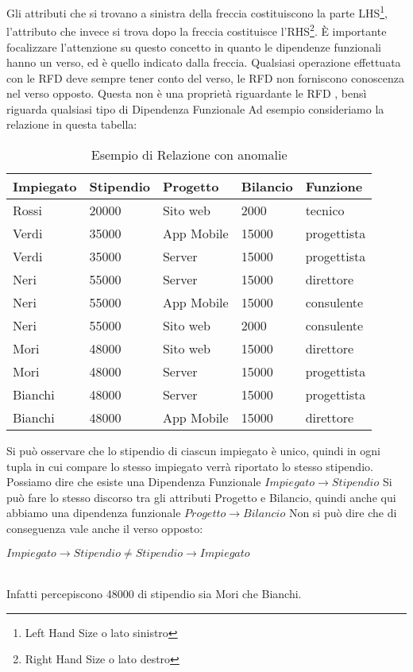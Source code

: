 Gli attributi che si trovano a sinistra della freccia costituiscono la parte LHS\footnote{Left Hand Size o lato sinistro}, l'attributo che invece si trova dopo la freccia costituisce l'RHS\footnote{Right Hand Size o lato destro}. 
È importante focalizzare l'attenzione su questo concetto in quanto le dipendenze funzionali hanno un verso, ed è quello indicato dalla freccia. Qualsiasi operazione effettuata con le RFD deve sempre tener conto del verso, le RFD non forniscono conoscenza nel verso opposto. Questa non è una proprietà riguardante le RFD , bensì riguarda qualsiasi tipo di Dipendenza Funzionale
Ad esempio consideriamo la relazione in questa tabella:
\\
\begin{table}[H]
    \centering
    \begin{tabular}{l |l |l |l |l }
     Impiegato & Stipendio & Progetto & Bilancio & Funzione \\
    \hline
    Rossi & 20000  & Sito web & 2000 & tecnico\\
    Verdi & 35000 & App Mobile & 15000 & progettista\\
    Verdi & 35000 & Server & 15000 & progettista\\
    Neri & 55000 & Server & 15000 & direttore\\
    Neri & 55000 & App Mobile & 15000 & consulente\\
    Neri & 55000 & Sito web & 2000 & consulente\\
    Mori & 48000 & Sito web & 15000 & direttore\\
    Mori & 48000 & Server & 15000 & progettista\\
    Bianchi & 48000 & Server & 15000 & progettista\\
    Bianchi & 48000 & App Mobile & 15000 & direttore\\
    \end{tabular}
    \caption{Esempio di Relazione con anomalie}
    \label{tab:relationship_anomalies}
\end{table}
Si può osservare che lo stipendio di ciascun impiegato è unico, quindi in ogni tupla in cui compare lo stesso impiegato verrà riportato lo stesso stipendio. Possiamo dire che esiste una Dipendenza Funzionale 
$Impiegato \xrightarrow{} Stipendio$
Si può fare lo stesso discorso tra gli attributi Progetto e Bilancio, quindi anche qui abbiamo una dipendenza funzionale
$Progetto\xrightarrow{}Bilancio$
Non si può dire che di conseguenza vale anche il verso opposto:
\\
\centerline{$Impiegato \xrightarrow{} Stipendio \neq Stipendio \xrightarrow{} Impiegato$} \\
Infatti percepiscono 48000 di stipendio sia Mori che Bianchi.\cite{libroCeri}
